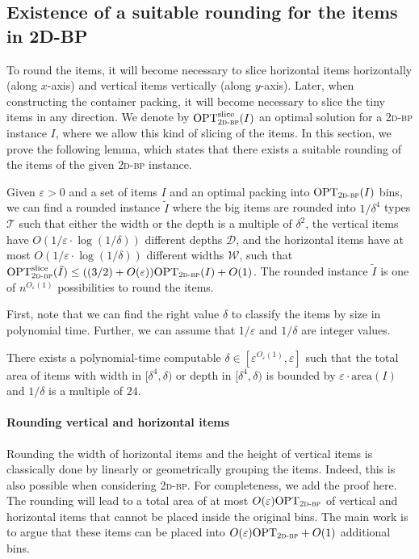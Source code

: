 \documentclass[a4paper,UKenglish,cleveref, autoref, thm-restate]{lipics-v2021}
\newcommand{\eps}{\varepsilon}
\newcommand{\opt}{\mathrm{OPT}}
\newcommand{\twobp}{\textsc{2d-bp}\xspace}
\newcommand{\bigy}{big\xspace}
\newcommand{\tin}{tiny\xspace}
\newcommand{\area}{\mathrm{area}}
\begin{document}
\subsection{Existence of a suitable rounding for the items in 2D-BP}
To round the items, it will become necessary to slice horizontal items horizontally (along $x$-axis) and vertical items vertically (along $y$-axis). 
Later, when constructing the container packing, it will become necessary to slice the \tin items in any direction.
We denote by $\opt_{\twobp}^{\mathrm{slice}}(I)$ an optimal solution for a \twobp instance $I$, where we allow this kind of slicing of the items. 
In this section, we prove the following lemma, which states that there exists a suitable rounding of the items of the given \twobp instance.

\begin{lemma}
\label{lem:twobp-rounding-main}
Given $\eps > 0$ and  a set of items $I$ and an optimal packing into $\opt_{\twobp}(I)$ bins, we can find a rounded instance $\tilde{I}$
where the \bigy items are rounded into $1/\delta^4$ types $\mathcal{T}$ such that either the width or the depth is a multiple of $\delta^2$, the vertical items have  $O(1/\eps \cdot \log(1/\delta))$ different depths $\mathcal{D}$, and the horizontal items have at most $O(1/\eps \cdot \log(1/\delta))$ different widths $\mathcal{W}$, such that $\opt_{\twobp}^{\mathrm{slice}}(\tilde{I}) \leq ((3/2)+O(\eps))\opt_{\twobp}(I) + O(1)$.
The rounded instance $\tilde{I}$ is one of $n^{O_{\eps}(1)}$ possibilities to round the items.
\end{lemma}

First, note that we can find the right value $\delta$ to classify the items by size in polynomial time. Further, we can assume that $1/\eps$ and $1/\delta$ are integer values.

\begin{lemma}
\label{lem:delta-twobp}
    There exists a polynomial-time computable $\delta \in [\eps^{O_{\eps}(1)},\eps]$ such that the total area of items with width in $[\delta^4,\delta)$ or depth in $[\delta^4,\delta)$ is bounded by $\eps\cdot \area(I)$ and $1/\delta$ is a multiple of $24$.
\end{lemma}

\paragraph*{Rounding vertical and horizontal items}
Rounding the width of horizontal items and the height of vertical items is classically done by linearly or geometrically grouping the items. 
Indeed, this is also possible when considering \twobp. 
For completeness, we add the proof here.
The rounding will lead to a total area of at most $O(\eps)\opt_{\twobp}$ of vertical and horizontal items that cannot be placed inside the original bins. 
The main work is to argue that these items can be placed into $O(\eps)\opt_{\twobp} +O(1)$ additional bins.
\end{document}
